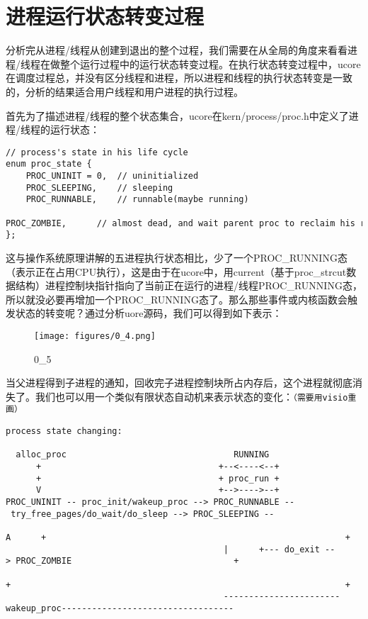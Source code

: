\section{进程运行状态转变过程}\label{ux8fdbux7a0bux8fd0ux884cux72b6ux6001ux8f6cux53d8ux8fc7ux7a0b}

分析完从进程/线程从创建到退出的整个过程，我们需要在从全局的角度来看看进程/线程在做整个运行过程中的运行状态转变过程。在执行状态转变过程中，ucore在调度过程总，并没有区分线程和进程，所以进程和线程的执行状态转变是一致的，分析的结果适合用户线程和用户进程的执行过程。

首先为了描述进程/线程的整个状态集合，ucore在kern/process/proc.h中定义了进程/线程的运行状态：

\begin{lstlisting}
// process's state in his life cycle
enum proc_state {
    PROC_UNINIT = 0,  // uninitialized
    PROC_SLEEPING,    // sleeping
    PROC_RUNNABLE,    // runnable(maybe running)
    PROC_ZOMBIE,      // almost dead, and wait parent proc to reclaim his resource
};
\end{lstlisting}

这与操作系统原理讲解的五进程执行状态相比，少了一个PROC\_RUNNING态（表示正在占用CPU执行），这是由于在ucore中，用current（基于proc\_strcut数据结构）进程控制块指针指向了当前正在运行的进程/线程PROC\_RUNNING态，所以就没必要再增加一个PROC\_RUNNING态了。那么那些事件或内核函数会触发状态的转变呢？通过分析uore源码，我们可以得到如下表示：

\begin{figure}[htbp]
\centering
\texttt{[image: figures/0\_4.png]}
\caption{0\_5}
\end{figure}

当父进程得到子进程的通知，回收完子进程控制块所占内存后，这个进程就彻底消失了。我们也可以用一个类似有限状态自动机来表示状态的变化：\lstinline!（需要用visio重画）!

\begin{lstlisting}
process state changing:

  alloc_proc                                 RUNNING
      +                                   +--<----<--+
      +                                   + proc_run +
      V                                   +-->---->--+ 
PROC_UNINIT -- proc_init/wakeup_proc --> PROC_RUNNABLE -- try_free_pages/do_wait/do_sleep --> PROC_SLEEPING --
                                           A      +                                                           +
                                           |      +--- do_exit --> PROC_ZOMBIE                                +
                                           +                                                                  + 
                                           -----------------------wakeup_proc----------------------------------
\end{lstlisting}

